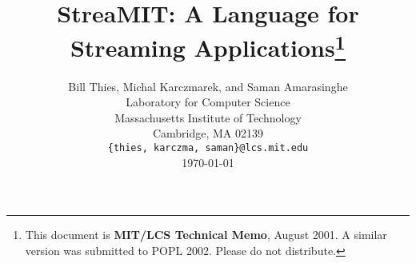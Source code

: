 \documentclass[psfig]{acm_proc_article-sp}
\begin{document}
\title{StreaMIT: A Language for Streaming Applications\thanks{This
document is {\bf MIT/LCS Technical Memo}, August 2001.  A similar
version was submitted to POPL 2002.  Please do not distribute.}}

\author{
\alignauthor Bill Thies, Michal Karczmarek, and Saman Amarasinghe\\
	\vspace{12pt}
	Laboratory for Computer Science \\
	Massachusetts Institute of Technology \\
	Cambridge, MA  02139 \\
	\vspace{12pt}
	{\tt \{thies, karczma, saman\}@lcs.mit.edu} \\
	\vspace{12pt}
        \today
}

\newcommand{\ma}[2]{max_{#1 \rightarrow #2}}
\newcommand{\mal}[1]{maxloop_{#1 \rightarrow #1}}
\newcommand{\mi}[2]{min_{#1 \leftarrow #2}}

\maketitle

\begin{abstract}

\end{abstract}












\end{document}
